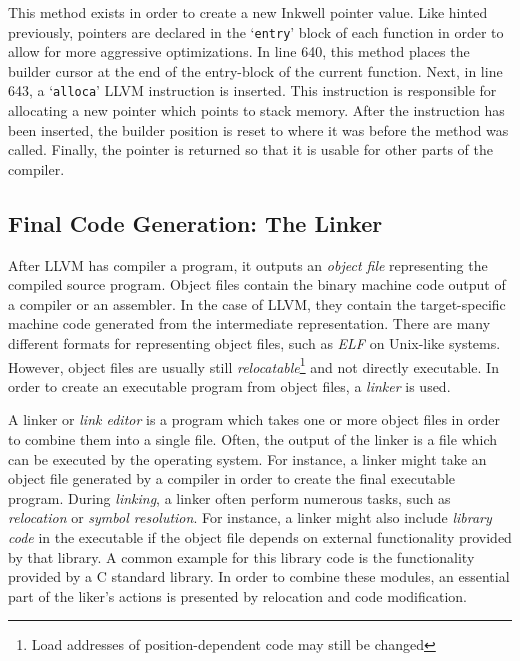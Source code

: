 This method exists in order to create a new Inkwell pointer value.
Like hinted previously, pointers are declared in the `\texttt{entry}' block of each function in order to allow for more aggressive optimizations.
In line 640, this method places the builder cursor at the end of the entry-block of the current function.
Next, in line 643, a `\texttt{alloca}' LLVM instruction is inserted.
This instruction is responsible for allocating a new pointer which points to stack memory.
After the instruction has been inserted, the builder position is reset to where it was before the method was called.
Finally, the pointer is returned so that it is usable for other parts of the compiler.

\subsection{Final Code Generation: The Linker}



After LLVM has compiler a program, it outputs an \emph{object file} representing the compiled source program.
Object files contain the binary machine code output of a compiler or an assembler.
In the case of LLVM, they contain the target-specific machine code generated from the intermediate representation.
There are many different formats for representing object files, such as \emph{ELF} on Unix-like systems.
However, object files are usually still \emph{relocatable}\footnote{Load addresses of position-dependent code may still be changed} and not directly executable.
In order to create an executable program from object files, a \emph{linker} is used.

A linker or \emph{link editor} is a program which takes one or more object files in order to combine them into a single file.
Often, the output of the linker is a file which can be executed by the operating system.
For instance, a linker might take an object file generated by a compiler in order to create the final executable program.
During \emph{linking}, a linker often perform numerous tasks, such as \emph{relocation} or \emph{symbol resolution}.
For instance, a linker might also include \emph{library code} in the executable if the object file depends on external functionality provided by that library.
A common example for this library code is the functionality provided by a C standard library.
In order to combine these modules, an essential part of the liker's actions is presented by relocation and code modification.

